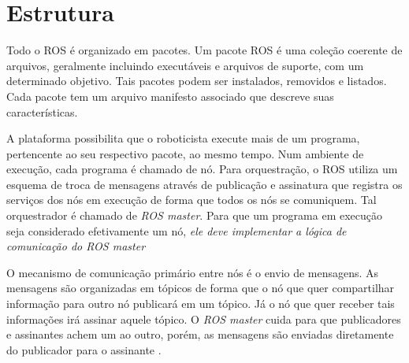 \documentclass[a4paper, 12pt]{article}
\begin{document}
\newpage

\section{Estrutura}

Todo o ROS é organizado em pacotes. Um pacote ROS é uma coleção coerente de arquivos, geralmente incluindo executáveis e arquivos de suporte, com um determinado objetivo. Tais  pacotes podem ser instalados, removidos e listados. %
Cada pacote tem um arquivo manifesto associado que descreve suas características.

A plataforma possibilita que o roboticista execute mais de um programa, pertencente ao seu respectivo pacote, ao mesmo tempo. Num ambiente de execução, cada programa é chamado de nó. Para orquestração, o ROS utiliza um esquema de troca de mensagens através de publicação e assinatura que registra os serviços dos nós em execução de forma que todos os nós se comuniquem. Tal orquestrador é chamado de \textit{ROS master}.
Para que um programa em execução seja considerado efetivamente um nó, \emph{ele deve implementar a lógica de comunicação do \textit{ROS master}}

O mecanismo de comunicação primário entre nós é o envio de mensagens. As mensagens são organizadas em tópicos de forma que o nó que quer compartilhar informação para outro nó publicará em um tópico. Já o nó que quer receber tais informações irá assinar aquele tópico. O \textit{ROS master} cuida para que publicadores e assinantes achem um ao outro, porém, as mensagens são enviadas diretamente do publicador para o assinante \cite{O'Kane201310}.

\newpage


 

\newpage
\end{document}
